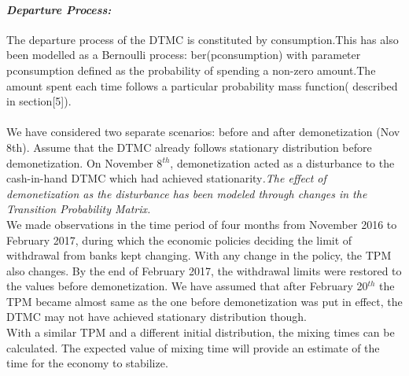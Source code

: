 \documentclass[12pt]{article}
\begin{document}
\paragraph{\textit{Departure Process:}}
The departure process of the DTMC is constituted by consumption.This has also been modelled as a Bernoulli process: ber(pconsumption) with parameter pconsumption defined as the probability of spending a non-zero amount.The amount spent each time follows a particular probability mass function( described in section[5]).
\paragraph{}
We have considered two separate scenarios: before and after demonetization (Nov 8th). 
Assume that the DTMC already follows stationary distribution before demonetization. 
On November 8$^{th}$, demonetization acted as a disturbance to the cash-in-hand DTMC which had achieved stationarity\textit{.The effect of demonetization as the disturbance has been modeled through changes in the Transition Probability Matrix.} \\We made observations in the time period of four months from November 2016 to February 2017, during which the economic policies deciding the limit of withdrawal from banks kept changing. With any change in the policy, the TPM also changes. By the end of February 2017, the withdrawal limits were restored to the values before demonetization.  We have assumed that after February 20$^{th}$ the TPM became almost same as the one before demonetization was put in effect, the DTMC may not have achieved stationary distribution though.\\ With a similar TPM and a different initial distribution, the mixing times can be calculated. The expected value of mixing time will provide an estimate of the time for the economy to stabilize.
\end{document}
